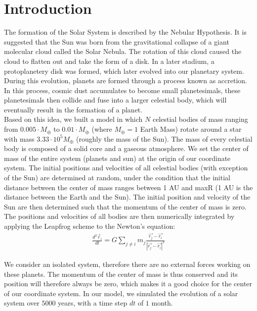 \section{Introduction}
The formation of the Solar System is described by the Nebular Hypothesis. It is suggested that the Sun was born from the gravitational collapse of a giant molecular cloud called the Solar Nebula. 
The rotation of this cloud caused the cloud to flatten out and take the form of a disk. In a later stadium, a protoplanetery disk was formed, which later evolved into our planetary system.
During this evolution, planets are formed through a process known as accretion.
In this process, cosmic dust accumulates to become small planetesimals, these planetesimals then collide and fuse into a larger celestial body, which will eventually result in the formation of a planet.\\

Based on this idea, we built a model in which \(N\) celestial bodies of mass ranging from $0.005\cdot M_{\oplus}$ to $0.01\cdot M_{\oplus}$ (where $M_{\oplus}=1$ Earth Mass) rotate around a star with mass $3.33\cdot 10^5 M_{\oplus}$ (roughly the mass of the Sun).
The mass of every celestial body is composed of a solid core and a gaseous atmosphere.
We set the center of mass of the entire system (planets and sun) at the origin of our coordinate system. 
The initial positions and velocities of all celestial bodies (with exception of the Sun) are determined at random, under the condition that the initial distance between the center of mass ranges between 1 AU and  maxR (1 AU is the distance between the Earth and the Sun). 
The initial position and velocity of the Sun are then determined such that the momentum of the center of mass is zero. 
The positions and velocities of all bodies are then numerically integrated by applying the Leapfrog scheme to the Newton's equation:
\begin{align}
\frac{d^2\vec{r}_i}{dt}=G\sum_{j\neq i}m_j\frac{\vec{r_j}-\vec{r_i}}{|\vec{r_j}-\vec{r_i}|^3}\label{eq:newton}
\end{align}

We consider an isolated system, therefore there are no external forces working on these planets. 
The momentum of the center of mass is thus conserved and its position will therefore always be zero, which makes it a good choice for the center of our coordinate system. 
In our model, we simulated the evolution of a solar system over $5000$ years, with a time step $dt$ of $1$ month.\\

